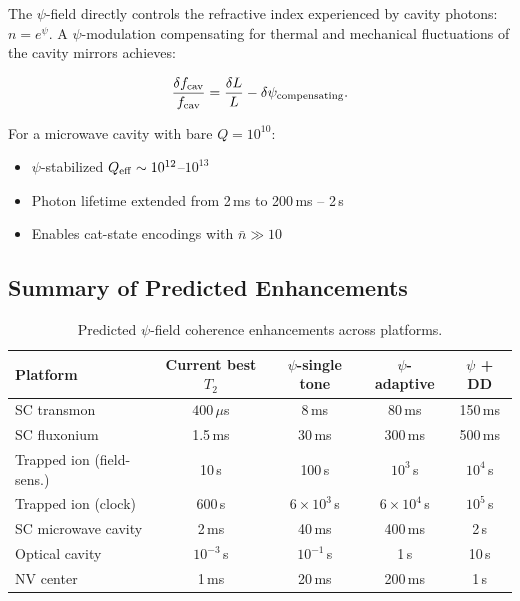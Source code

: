 \documentclass[aps,prd,twocolumn,superscriptaddress,nofootinbib]{revtex4-2}
\begin{document}
The $\psi$-field directly controls the refractive index experienced by
cavity photons: $n = e^\psi$. A $\psi$-modulation compensating for
thermal and mechanical fluctuations of the cavity mirrors achieves:

\begin{equation}
\frac{\delta f_{\rm cav}}{f_{\rm cav}} = \frac{\delta L}{L}
- \delta\psi_{\rm compensating}.
\end{equation}

For a microwave cavity with bare $Q = 10^{10}$:
\begin{itemize}
\item $\psi$-stabilized $Q_{\rm eff} \sim 10^{12}$--$10^{13}$
\item Photon lifetime extended from 2\,ms to 200\,ms -- 2\,s
\item Enables cat-state encodings with $\bar{n} \gg 10$
\end{itemize}

\subsection{Summary of Predicted Enhancements}

\begin{table}[t]
\caption{Predicted $\psi$-field coherence enhancements across platforms.}
\label{tab:enhancements}
\begin{ruledtabular}
\begin{tabular}{lcccc}
\textbf{Platform} & \textbf{Current best $T_2$} & \textbf{$\psi$-single tone}
& \textbf{$\psi$-adaptive} & \textbf{$\psi$ + DD} \\
\hline
SC transmon & $400\,\mu$s & 8\,ms & 80\,ms & 150\,ms \\
SC fluxonium & 1.5\,ms & 30\,ms & 300\,ms & 500\,ms \\
Trapped ion (field-sens.) & 10\,s & 100\,s & $10^3$\,s & $10^4$\,s \\
Trapped ion (clock) & 600\,s & $6 \times 10^3$\,s & $6 \times 10^4$\,s & $10^5$\,s \\
SC microwave cavity & 2\,ms & 40\,ms & 400\,ms & 2\,s \\
Optical cavity & $10^{-3}$\,s & $10^{-1}$\,s & 1\,s & 10\,s \\
NV center & 1\,ms & 20\,ms & 200\,ms & 1\,s \\
\end{tabular}
\end{ruledtabular}
\end{table}
\end{document}
